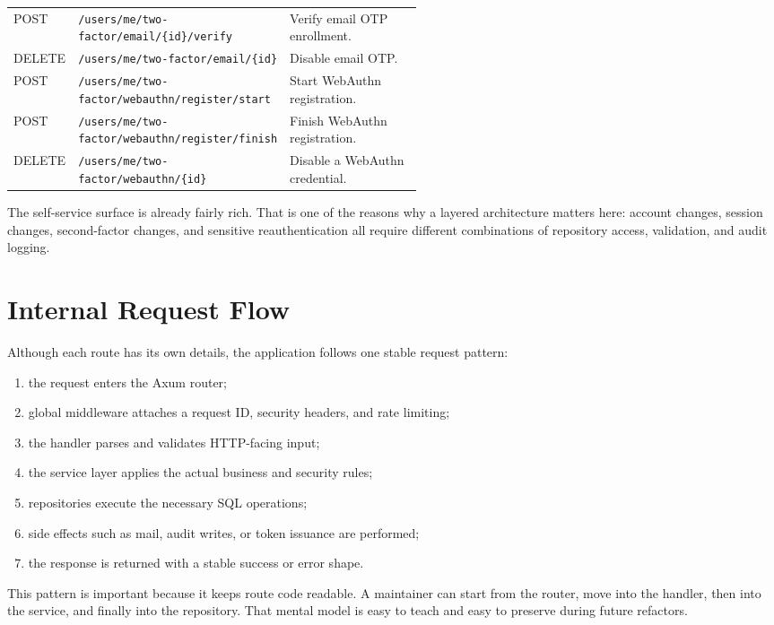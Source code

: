 \documentclass[11pt,a4paper]{article}
\newcommand{\route}[1]{\nolinkurl{#1}}
\begin{document}
\begin{table}[H]
\begin{tabularx}{\linewidth}{T{0.12\linewidth} T{0.41\linewidth} Y}
POST & \route{/users/me/two-factor/email/\{id\}/verify} & Verify email OTP enrollment. \\
DELETE & \route{/users/me/two-factor/email/\{id\}} & Disable email OTP. \\
POST & \route{/users/me/two-factor/webauthn/register/start} & Start WebAuthn registration. \\
POST & \route{/users/me/two-factor/webauthn/register/finish} & Finish WebAuthn registration. \\
DELETE & \route{/users/me/two-factor/webauthn/\{id\}} & Disable a WebAuthn credential. \\
\bottomrule
\end{tabularx}
\end{table}

The self-service surface is already fairly rich. That is one of the reasons why a layered architecture matters here: account changes, session changes, second-factor changes, and sensitive reauthentication all require different combinations of repository access, validation, and audit logging.

\section{Internal Request Flow}

Although each route has its own details, the application follows one stable request pattern:

\begin{enumerate}
  \item the request enters the Axum router;
  \item global middleware attaches a request ID, security headers, and rate limiting;
  \item the handler parses and validates HTTP-facing input;
  \item the service layer applies the actual business and security rules;
  \item repositories execute the necessary SQL operations;
  \item side effects such as mail, audit writes, or token issuance are performed;
  \item the response is returned with a stable success or error shape.
\end{enumerate}

This pattern is important because it keeps route code readable. A maintainer can start from the router, move into the handler, then into the service, and finally into the repository. That mental model is easy to teach and easy to preserve during future refactors.
\end{document}
